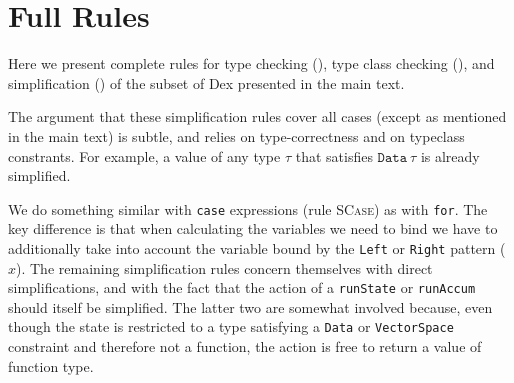 \documentclass[acmsmall,screen,nonacm]{acmart}
\newcommand{\ttt}[1]{\texttt{#1}}
\newcommand{\tsc}[1]{\textsc{#1}}
\newif\ifextended
\begin{document}



\ifextended
\newpage
\appendix
\section{Full Rules}
\label{sec:full-rules}

Here we present complete rules for type checking (), type class checking (), and simplification () of the subset of Dex presented in the main text.

The argument that these simplification rules cover all cases (except as mentioned in the main text) is subtle, and relies on type-correctness and on typeclass constrants.
For example, a value of any type $\tau$ that satisfies $\ttt{Data}\ \tau$ is already simplified.

We do something similar with \ttt{case} expressions (rule \tsc{SCase}) as with \ttt{for}. The key difference is that when calculating the variables we need to bind we have to additionally
take into account the variable bound by the {\tt Left} or {\tt Right} pattern ($x$).
The remaining simplification rules concern themselves with direct simplifications, and with the fact that the action of a \ttt{runState} or \ttt{runAccum} should itself be simplified.
The latter two are somewhat involved because, even though the state is restricted to a type satisfying a \ttt{Data} or \ttt{VectorSpace} constraint and therefore not a function, the action is free to return a value of function type.
\end{document}
